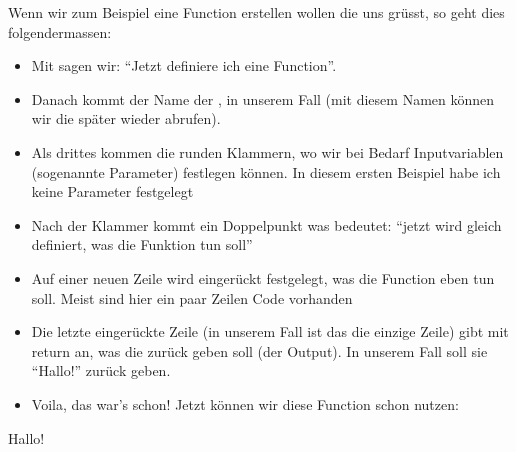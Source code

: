 \documentclass[letterpaper,10pt,english]{sphinxmanual}
\begin{document}
Wenn wir zum Beispiel eine Function erstellen wollen die uns grüsst, so geht dies folgendermassen:

\begin{sphinxVerbatim}[commandchars=\\\{\}]
 
\end{sphinxVerbatim}
\begin{itemize}
\item {} 
Mit  sagen wir: “Jetzt definiere ich eine Function”.

\item {} 
Danach kommt der Name der , in unserem Fall  (mit diesem Namen können wir die  später wieder abrufen).

\item {} 
Als drittes kommen die runden Klammern, wo wir bei Bedarf Inputvariablen (sogenannte Parameter) festlegen können. In diesem ersten Beispiel habe ich keine Parameter festgelegt

\item {} 
Nach der Klammer kommt ein Doppelpunkt was bedeutet: “jetzt wird gleich definiert, was die Funktion tun soll”

\item {} 
Auf einer neuen Zeile wird eingerückt festgelegt, was die Function eben tun soll. Meist sind hier ein paar Zeilen Code vorhanden

\item {} 
Die letzte eingerückte Zeile (in unserem Fall ist das die einzige Zeile) gibt mit return an, was die  zurück geben soll (der Output). In unserem Fall soll sie “Hallo!”  zurück geben.

\item {} 
Voila, das war’s schon! Jetzt können wir diese Function schon nutzen:

\end{itemize}

\begin{sphinxVerbatim}[commandchars=\\\{\}]
\end{sphinxVerbatim}

\begin{sphinxVerbatim}[commandchars=\\\{\}]
\PYGZsq{}Hallo!\PYGZsq{}
\end{sphinxVerbatim}
\end{document}
